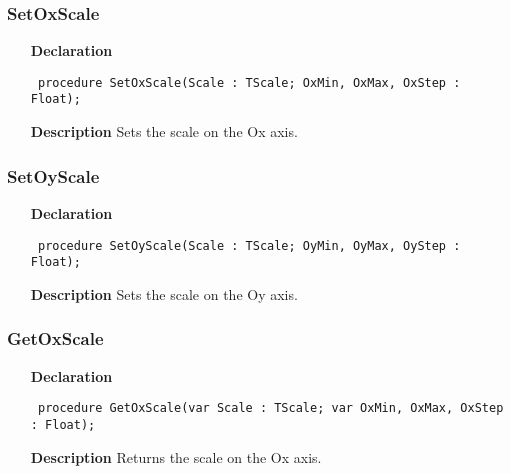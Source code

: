 \documentclass[12pt,a4paper,oneside]{report}
\newcommand{\declarationitem}[1]{\textbf{#1}}
\newcommand{\descriptiontitle}[1]{\textbf{#1}}
\newcommand{\code}[1]{\texttt{#1}}
\begin{document}
\subsubsection{SetOxScale}
\label{uplot-SetOxScale}
\begin{itemize}\item[\declarationitem{Declaration}\hfill]
	\begin{flushleft}
		\code{
			procedure SetOxScale(Scale : TScale; OxMin, OxMax, OxStep : Float);}
		
	\end{flushleft}
	
	\par
	\item[\descriptiontitle{Description}]
	Sets the scale on the Ox axis.
\end{itemize}
\subsubsection{SetOyScale}
\label{uplot-SetOyScale}
\begin{itemize}\item[\declarationitem{Declaration}\hfill]
	\begin{flushleft}
		\code{
			procedure SetOyScale(Scale : TScale; OyMin, OyMax, OyStep : Float);}
		
	\end{flushleft}
	
	\par
	\item[\descriptiontitle{Description}]
	Sets the scale on the Oy axis.
	
\end{itemize}
\subsubsection{GetOxScale}
\label{uplot-GetOxScale}
\begin{itemize}\item[\declarationitem{Declaration}\hfill]
	\begin{flushleft}
		\code{
			procedure GetOxScale(var Scale : TScale; var OxMin, OxMax, OxStep : Float);}
		
	\end{flushleft}
	
	\par
	\item[\descriptiontitle{Description}]
	Returns the scale on the Ox axis.
	
\end{itemize}
\end{document}
